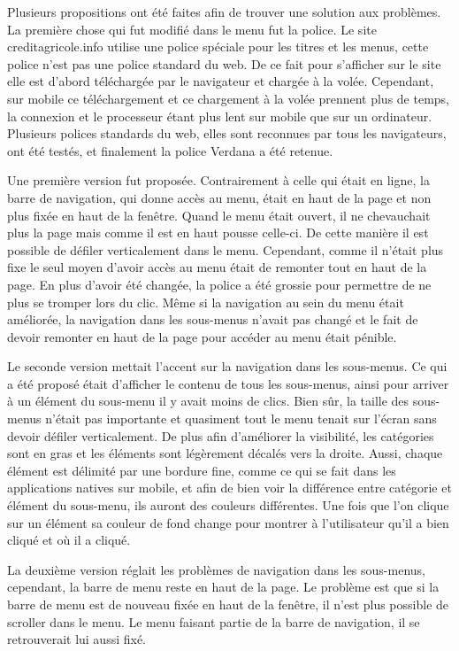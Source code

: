 \documentclass[12pt,a4paper]{article}
\begin{document}
Plusieurs propositions ont été faites afin de trouver une solution aux problèmes. La première chose qui fut modifié dans le menu fut la police. Le site creditagricole.info utilise une police spéciale pour les titres et les menus, cette police n'est pas une police standard du web. De ce fait pour s'afficher sur le site elle est d'abord téléchargée par le navigateur et chargée à la volée. Cependant, sur mobile ce téléchargement et ce chargement à la volée prennent plus de temps, la connexion et le processeur étant plus lent sur mobile que sur un ordinateur. Plusieurs polices standards du web, elles sont reconnues par tous les navigateurs, ont été testés, et finalement la police Verdana a été retenue.\par
\medskip
Une première version fut proposée. Contrairement à celle qui était en ligne, la barre de navigation, qui donne accès au menu, était en haut de la page et non plus fixée en haut de la fenêtre. Quand le menu était ouvert, il ne chevauchait plus la page mais comme il est en haut pousse celle-ci. De cette manière il est possible de défiler verticalement dans le menu. Cependant, comme il n'était plus fixe le seul moyen d'avoir accès au menu était de remonter tout en haut de la page. En plus d'avoir été changée, la police a été grossie pour permettre de ne plus se tromper lors du clic. Même si la navigation au sein du menu était améliorée, la navigation dans les sous-menus n'avait pas changé et le fait de devoir remonter en haut de la page pour accéder au menu était pénible.\par
\medskip
Le seconde version mettait l'accent sur la navigation dans les sous-menus. Ce qui a été proposé était d'afficher le contenu de tous les sous-menus, ainsi pour arriver à un élément du sous-menu il y avait moins de clics. Bien sûr, la taille des sous-menus n'était pas importante et quasiment tout le menu tenait sur l'écran sans devoir défiler verticalement. De plus afin d'améliorer la visibilité, les catégories sont en gras et les éléments sont légèrement décalés vers la droite. Aussi, chaque élément est délimité par une bordure fine, comme ce qui se fait dans les applications natives sur mobile, et afin de bien voir la différence entre catégorie et élément du sous-menu, ils auront des couleurs différentes. Une fois que l'on clique sur un élément sa couleur de fond change pour montrer à l'utilisateur qu'il a bien cliqué et où il a cliqué.\par
La deuxième version réglait les problèmes de navigation dans les sous-menus, cependant, la barre de menu reste en haut de la page. Le problème est que si la barre de menu est de nouveau fixée en haut de la fenêtre, il n'est plus possible de scroller dans le menu. Le menu faisant partie de la barre de navigation, il se retrouverait lui aussi fixé.\par
\end{document}
